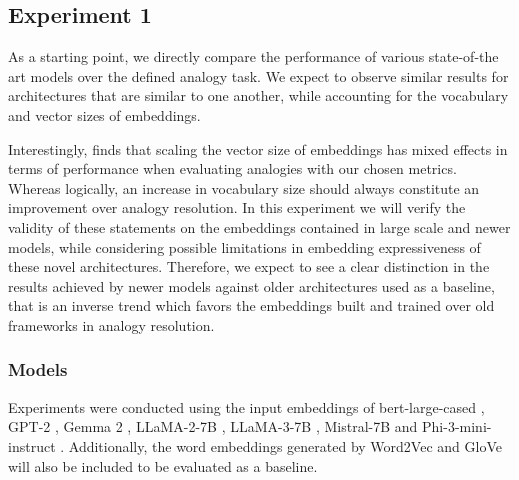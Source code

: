 

\subsection{Experiment 1}\label{ssec:exp_emb_exp1}

As a starting point, we directly compare the performance of various state-of-the art models over the defined analogy task.
We expect to observe similar results for architectures that are similar to one another, while accounting for the vocabulary and vector sizes of embeddings.

Interestingly, \citet{drozd2016} finds that scaling the vector size of embeddings has mixed effects in terms of performance when evaluating analogies with our chosen metrics.
Whereas logically, an increase in vocabulary size should always constitute an improvement over analogy resolution.
In this experiment we will verify the validity of these statements on the embeddings contained in large scale and newer models, while considering possible limitations in embedding expressiveness of these novel architectures.
Therefore, we expect to see a clear distinction in the results achieved by newer models against older architectures used as a baseline, that is an inverse trend which favors the embeddings built and trained over old frameworks in analogy resolution.

\subsubsection{Models}

Experiments were conducted using the input embeddings of bert-large-cased , GPT-2 , Gemma 2 , LLaMA-2-7B , LLaMA-3-7B , Mistral-7B  and Phi-3-mini-instruct .
Additionally, the word embeddings generated by Word2Vec  and GloVe  will also be included to be evaluated as a baseline.

